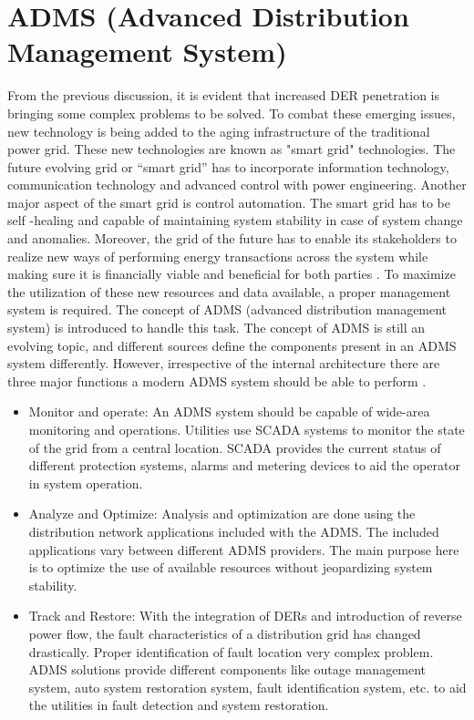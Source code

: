 \section{ADMS (Advanced Distribution Management System)}
From the previous discussion, it is evident that increased DER penetration is bringing some complex problems to be solved. To combat these emerging issues, new technology is being added to the aging infrastructure of the traditional power grid. These new technologies are known as "smart grid" technologies. The future evolving grid or “smart grid” has to incorporate information technology, communication technology and advanced control with power engineering. Another major aspect of the smart grid is control automation. The smart grid has to be self -healing and capable of maintaining system stability in case of system change and anomalies. Moreover, the grid of the future has to enable its stakeholders to realize new ways of performing energy transactions across the system while making sure it is financially viable and beneficial for both parties \cite{SG1}. To maximize the utilization of these new resources and data available, a proper management system is required. The concept of ADMS (advanced distribution management system) is introduced to handle this task. The concept of ADMS is still an evolving topic, and different sources define the components present in an ADMS system differently. However, irrespective of the internal architecture there are three major functions a modern ADMS system should be able to perform \cite{ADMS_1}.
\begin{itemize}
    \item Monitor and operate: An ADMS system should be capable of wide-area monitoring and operations. Utilities use SCADA systems to monitor the state of the grid from a central location. SCADA provides the current status of different protection systems, alarms and metering devices to aid the operator in system operation.
    \item Analyze and Optimize: Analysis and optimization are done using the distribution network applications included with the ADMS. The included applications vary between different ADMS providers. The main purpose here is to optimize the use of available resources without jeopardizing system stability.
    \item Track and Restore: With the integration of DERs and introduction of reverse power flow, the fault characteristics of a distribution grid has changed drastically. Proper identification of fault location very complex problem. ADMS solutions provide different components like outage management system, auto system restoration system, fault identification system, etc. to aid the utilities in fault detection and system restoration.
\end{itemize}
